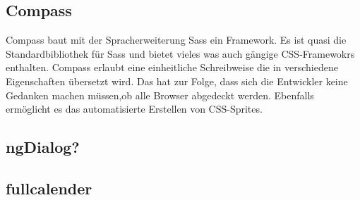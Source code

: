 \subsection{Compass}
Compass baut mit der Spracherweiterung Sass ein Framework. Es ist quasi die Standardbibliothek für Sass und bietet vieles was auch gängige CSS-Framewokrs enthalten. Compass erlaubt eine einheitliche Schreibweise die in verschiedene Eigenschaften übersetzt wird. Das hat zur Folge, dass sich die Entwickler keine Gedanken machen müssen,ob alle Browser abgedeckt werden. Ebenfalls ermöglicht es das automatisierte Erstellen von CSS-Sprites. 

\subsection{ngDialog?}

\subsection{fullcalender}


